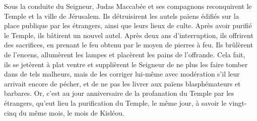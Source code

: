 Sous la conduite du Seigneur,
	Judas Maccabée et ses compagnons reconquirent le Temple et la ville de Jérusalem.
Ils détruisirent les autels païens édifiés sur la place publique par les étrangers,
	ainsi que leurs lieux de culte.
Après avoir purifié le Temple, ils bâtirent un nouvel autel.
Après deux ans d’interruption, ils offrirent des sacrifices,
	en prenant le feu obtenu par le moyen de pierres à feu.
Ils brûlèrent de l’encens, allumèrent les lampes et placèrent les pains de l’offrande.
Cela fait, ils se jetèrent à plat ventre
	et supplièrent le Seigneur de ne plus les faire tomber dans de tels malheurs,
	mais de les corriger lui-même avec modération s’il leur arrivait encore de pécher,
	et de ne pas les livrer aux païens blasphémateurs et barbares.
Or, c’est au jour anniversaire de la profanation du Temple par les étrangers,
		qu’eut lieu la purification du Temple,
	le même jour, à savoir le vingt-cinq du même mois, le mois de Kisléou.
